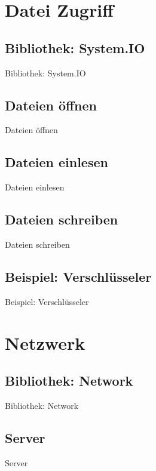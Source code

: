 \documentclass{beamer}
\begin{document}
\section{Datei Zugriff}
\subsection{Bibliothek: System.IO}
\begin{frame}{Bibliothek: System.IO}
\end{frame}

\subsection{Dateien \"offnen}
\begin{frame}{Dateien \"offnen}
\end{frame}

\subsection{Dateien einlesen}
\begin{frame}{Dateien einlesen}
\end{frame}

\subsection{Dateien schreiben}
\begin{frame}{Dateien schreiben}
\end{frame}

\subsection{Beispiel: Verschl\"usseler}
\begin{frame}{Beispiel: Verschl\"usseler}
\end{frame}

\section{Netzwerk}
\subsection{Bibliothek: Network}
\begin{frame}{Bibliothek: Network}
\end{frame}

\subsection{Server}
\begin{frame}{Server}
\end{frame}
\end{document}

